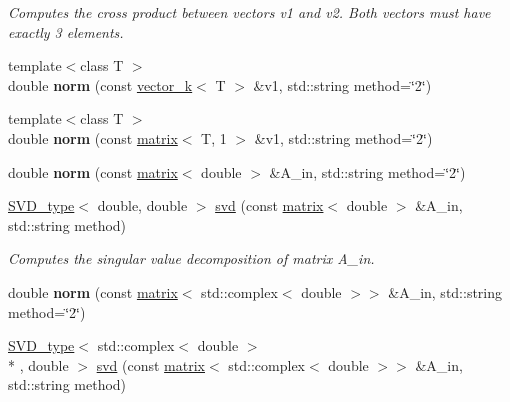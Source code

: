 \begin{DoxyCompactItemize}
\begin{DoxyCompactList}\small\item\em Computes the cross product between vectors v1 and v2. Both vectors must have exactly 3 elements. \end{DoxyCompactList}\item 
\hypertarget{namespacekeycpp_a78ea0301dbb858bbfdf2646a857a1ec6}{{\footnotesize template$<$class T $>$ }\\double {\bfseries norm} (const \hyperlink{classkeycpp_1_1vector__k}{vector\-\_\-k}$<$ T $>$ \&v1, std\-::string method=\char`\"{}2\char`\"{})}\label{namespacekeycpp_a78ea0301dbb858bbfdf2646a857a1ec6}

\item 
\hypertarget{namespacekeycpp_ab1fd21d6dd27cb843b98af78a3ea6acc}{{\footnotesize template$<$class T $>$ }\\double {\bfseries norm} (const \hyperlink{classkeycpp_1_1matrix}{matrix}$<$ T, 1 $>$ \&v1, std\-::string method=\char`\"{}2\char`\"{})}\label{namespacekeycpp_ab1fd21d6dd27cb843b98af78a3ea6acc}

\item 
\hypertarget{namespacekeycpp_aeb34bdd249af3ce92341cdda62f95f65}{double {\bfseries norm} (const \hyperlink{classkeycpp_1_1matrix}{matrix}$<$ double $>$ \&A\-\_\-in, std\-::string method=\char`\"{}2\char`\"{})}\label{namespacekeycpp_aeb34bdd249af3ce92341cdda62f95f65}

\item 
\hypertarget{namespacekeycpp_a838fc93d66e1ab63d68d04781086d81a}{\hyperlink{classkeycpp_1_1_s_v_d__type}{S\-V\-D\-\_\-type}$<$ double, double $>$ \hyperlink{namespacekeycpp_a838fc93d66e1ab63d68d04781086d81a}{svd} (const \hyperlink{classkeycpp_1_1matrix}{matrix}$<$ double $>$ \&A\-\_\-in, std\-::string method)}\label{namespacekeycpp_a838fc93d66e1ab63d68d04781086d81a}

\begin{DoxyCompactList}\small\item\em Computes the singular value decomposition of matrix A\-\_\-in. \end{DoxyCompactList}\item 
\hypertarget{namespacekeycpp_ad211ab5ae14ac9710265c662f70f20ff}{double {\bfseries norm} (const \hyperlink{classkeycpp_1_1matrix}{matrix}$<$ std\-::complex$<$ double $>$$>$ \&A\-\_\-in, std\-::string method=\char`\"{}2\char`\"{})}\label{namespacekeycpp_ad211ab5ae14ac9710265c662f70f20ff}

\item 
\hypertarget{namespacekeycpp_ad610adca37ac4c85df23b899d29d5dfc}{\hyperlink{classkeycpp_1_1_s_v_d__type}{S\-V\-D\-\_\-type}$<$ std\-::complex$<$ double $>$\\*
, double $>$ \hyperlink{namespacekeycpp_ad610adca37ac4c85df23b899d29d5dfc}{svd} (const \hyperlink{classkeycpp_1_1matrix}{matrix}$<$ std\-::complex$<$ double $>$$>$ \&A\-\_\-in, std\-::string method)}\label{namespacekeycpp_ad610adca37ac4c85df23b899d29d5dfc}


\end{DoxyCompactItemize}
